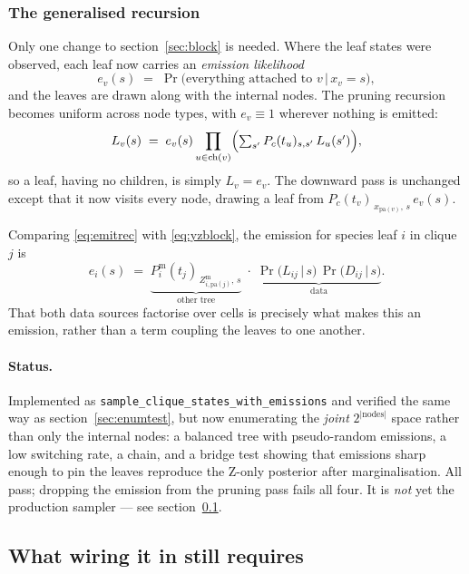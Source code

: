 \documentclass[11pt,a4paper]{article}
\newcommand{\Zm}{Z^{\mathrm{m}}}
\newcommand{\pa}{\mathrm{pa}}
\newcommand{\ch}{\mathrm{ch}}
\newcommand{\given}{\,\vert\,}
\begin{document}
\subsubsection*{The generalised recursion}

Only one change to section~\ref{sec:block} is needed. Where the leaf states were observed,
each leaf now carries an \emph{emission likelihood}
\[
  e_v(s) \;=\; \Pr\bigl(\text{everything attached to } v \given x_v = s\bigr),
\]
and the leaves are drawn along with the internal nodes. The pruning recursion becomes uniform
across node types, with $e_v \equiv 1$ wherever nothing is emitted:
\begin{equation}
  L_v(s) \;=\; e_v(s) \prod_{u \in \ch(v)}
               \Bigl(\textstyle\sum_{s'} P_c(t_u)_{s,s'}\, L_u(s')\Bigr),
  \label{eq:emitrec}
\end{equation}
so a leaf, having no children, is simply $L_v = e_v$. The downward pass is unchanged except
that it now visits every node, drawing a leaf from
$P_c(t_v)_{\,x_{\pa(v)},\,s}\, e_v(s)$.

Comparing \eqref{eq:emitrec} with \eqref{eq:yzblock}, the emission for species leaf $i$ in
clique $j$ is
\[
  e_i(s) \;=\;
  \underbrace{P^{\mathrm{m}}_i(t_j)_{\,\Zm_{i,\pa(j)},\,s}}_{\text{other tree}}
  \;\cdot\;
  \underbrace{\Pr\bigl(L_{ij}\given s\bigr)\,\Pr\bigl(D_{ij}\given s\bigr)}_{\text{data}} .
\]
That both data sources factorise over cells is precisely what makes this an emission, rather
than a term coupling the leaves to one another.

\paragraph{Status.} Implemented as \texttt{sample\_clique\_states\_with\_emissions} and
verified the same way as section~\ref{sec:enumtest}, but now enumerating the \emph{joint}
$2^{\lvert\text{nodes}\rvert}$ space rather than only the internal nodes: a balanced tree with
pseudo-random emissions, a low switching rate, a chain, and a bridge test showing that
emissions sharp enough to pin the leaves reproduce the Z-only posterior after marginalisation.
All pass; dropping the emission from the pruning pass fails all four. It is \emph{not} yet the
production sampler --- see section~\ref{sec:wiring}.

\subsection{What wiring it in still requires}
\label{sec:wiring}
\end{document}
